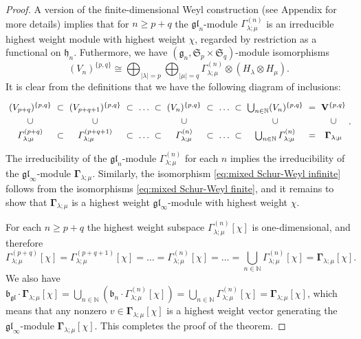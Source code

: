 \documentclass[12pt,reqno]{amsart}
\numberwithin{equation}{section}
\theoremstyle{plain}
\theoremstyle{definition}
\def\N{\mathbb N}
\def\gl{\mathfrak{gl}}
\def\o{\otimes}
\def\g{\mathfrak g}
\def\b{\mathfrak b}
\def\h{\mathfrak h}
\def\glV_#1{\boldsymbol\Gamma_{#1}}
\def\VV{\mathbf V}
\def\({\left(}
\def\){\right)}
\begin{document}
\begin{proof}
A version of the finite-dimensional Weyl construction (see Appendix
for more details) implies that for $n\ge p+q$ the $\gl_n$-module
$\varGamma_{\lambda;\mu}^{(n)}$ is an irreducible highest weight
module with highest weight $\chi$, regarded by restriction as a
functional on $\h_n$. Futhermore, we have $(\g_n, \mathfrak S_p \times
\mathfrak S_q)$-module isomorphisms
\begin{equation}\label{eq:mixed Schur-Weyl finite}
    (V_n)^{\{p,q\}} \cong \bigoplus_{|\lambda|=p} \bigoplus_{|\mu| = q}
    \varGamma_{\lambda;\mu}^{(n)} \o (H_\lambda \o H_\mu).
\end{equation}
It is clear from the definitions that we have the following diagram
of inclusions:
\begin{equation}\label{eq:exhaustions gl}
\begin{gathered}\xymatrix@C=0pt@R=0pt{
    (V_{p+q})^{\{p,q\}} & \subset & (V_{p+q+1})^{\{p,q\}} & \subset &\dots &\subset &(V_n)^{\{p,q\}}
    &\subset &\dots &\subset  &\bigcup_{n\in\N} (V_n)^{ \{p,q\} } & = & \VV^{\{p,q\}}
    \\
    \cup &&      \cup &&     &&     \cup &&     &&     \cup &&    \cup
    \\
    \varGamma_{\lambda;\mu}^{(p+q)} & \subset & \varGamma_{\lambda;\mu}^{(p+q+1)} &\subset &\dots &\subset &\varGamma_{\lambda;\mu}^{(n)}
    &\subset &\dots &\subset &\bigcup_{n\in\N} \varGamma_{\lambda;\mu}^{(n)} & = & \glV_{\lambda;\mu}
    }
\end{gathered}.
\end{equation}
The irreducibility of the $\gl_n$-module
$\varGamma_{\lambda;\mu}^{(n)}$ for each $n$ implies the irreducibility of the
$\gl_\infty$-module $\glV_{\lambda;\mu}$. Similarly, the isomorphism
\eqref{eq:mixed Schur-Weyl infinite} follows from the isomorphisms
\eqref{eq:mixed Schur-Weyl finite}, and it remains to show that
$\glV_{\lambda;\mu}$ is a highest weight $\gl_\infty$-module with
highest weight $\chi$.

For each $n\ge p+q$ the highest weight subspace
$\varGamma_{\lambda;\mu}^{(n)}[\chi]$ is one-dimensional, and
therefore
\begin{equation*}
    \varGamma_{\lambda;\mu}^{(p+q)}[\chi] = \varGamma_{\lambda;\mu}^{(p+q+1)}[\chi]=
    \dots = \varGamma_{\lambda;\mu}^{(n)}[\chi] = \dots = \bigcup_{n\in\N} \varGamma_{\lambda;\mu}^{(n)}[\chi] = \glV_{\lambda;\mu}[\chi].
\end{equation*}
We also have $\b_\gl \cdot \glV_{\lambda;\mu}[\chi] =
\bigcup_{n\in\N} \( \b_n \cdot \varGamma_{\lambda;\mu}^{(n)}[\chi]
\) = \bigcup_{n\in\N} \varGamma_{\lambda;\mu}^{(n)}[\chi] =
\glV_{\lambda;\mu}[\chi]$, which means that any nonzero $v
\in\glV_{\lambda;\mu}[\chi]$ is a highest weight vector generating
the $\gl_\infty$-module $\glV_{\lambda;\mu}[\chi]$. This completes
the proof of the theorem.
\end{proof}
\end{document}
